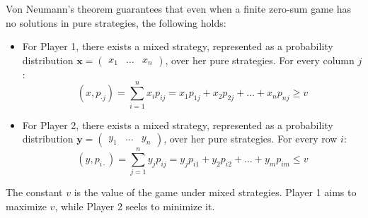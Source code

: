 Von Neumann's theorem guarantees that even when a finite zero-sum game has no solutions in pure strategies, the following holds:
\begin{itemize}
    \item For Player 1, there exists a mixed strategy, represented as a probability distribution $\mathbf{x}=\begin{pmatrix}x_1 & \dots & x_n\end{pmatrix}$, over her pure strategies. 
        For every column $j$: 
        \[(x,p_{\cdot j})=\sum_{i=1}^nx_ip_{ij}=x_1p_{1j}+x_2p_{2j}+\dots+x_np_{nj}\geq v\]
     \item For Player 2, there exists a mixed strategy, represented as a probability distribution $\mathbf{y}=\begin{pmatrix}y_1 & \dots & y_n\end{pmatrix}$, over her pure strategies.
        For every row $i$: 
        \[(y,p_{i\cdot})=\sum_{j=1}^ny_jp_{ij}=y_jp_{i1}+y_2p_{i2}+\dots+y_mp_{im}\leq v\]
\end{itemize}
The constant $v$ is the value of the game under mixed strategies. 
Player 1 aims to maximize $v$, while Player 2 seeks to minimize it.